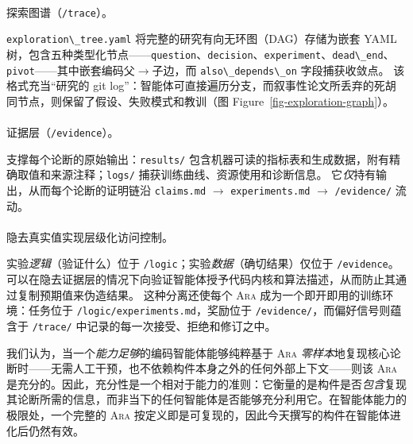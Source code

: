 \documentclass[
]{article}
\makeatletter
\let\oldparagraph\paragraph
\renewcommand{\paragraph}{
    \@ifstar
      \xxxParagraphStar
      \xxxParagraphNoStar
  }
\newcommand{\xxxParagraphStar}[1]{\oldparagraph*{#1}\mbox{}}
\newcommand{\xxxParagraphNoStar}[1]{\oldparagraph{#1}\mbox{}}
\newcommand{\passthrough}[1]{#1}
\theoremstyle{definition}
\newcommand{\ara}{\textsc{Ara}}
\makeatother
\begin{document}
\paragraph{\texorpdfstring{探索图谱（\texttt{/trace}）。}{探索图谱（/trace）。}}\label{ux63a2ux7d22ux56feux8c31trace}

\passthrough{\lstinline!exploration\_tree.yaml!}
将完整的研究有向无环图（DAG）存储为嵌套 YAML
树，包含五种类型化节点------\passthrough{\lstinline!question!}、\passthrough{\lstinline!decision!}、\passthrough{\lstinline!experiment!}、\passthrough{\lstinline!dead\_end!}、\passthrough{\lstinline!pivot!}------其中嵌套编码父\(\to\)子边，而
\passthrough{\lstinline!also\_depends\_on!} 字段捕获收敛点。
该格式充当``研究的 git
log''：智能体可直接遍历分支，而叙事性论文所丢弃的死胡同节点，则保留了假设、失败模式和教训（图
Figure~\ref{fig-exploration-graph}）。

\paragraph{\texorpdfstring{证据层（\texttt{/evidence}）。}{证据层（/evidence）。}}\label{ux8bc1ux636eux5c42evidence}

支撑每个论断的原始输出：\passthrough{\lstinline!results/!}
包含机器可读的指标表和生成数据，附有精确取值和来源注释；\passthrough{\lstinline!logs/!}
捕获训练曲线、资源使用和诊断信息。
它\emph{仅}持有输出，从而每个论断的证明链沿
\passthrough{\lstinline!claims.md!} \(\to\)
\passthrough{\lstinline!experiments.md!} \(\to\)
\passthrough{\lstinline!/evidence/!} 流动。

\paragraph{隐去真实值实现层级化访问控制。}\label{ux9690ux53bbux771fux5b9eux503cux5b9eux73b0ux5c42ux7ea7ux5316ux8bbfux95eeux63a7ux5236}

实验\emph{逻辑}（验证什么）位于
\passthrough{\lstinline!/logic!}；实验\emph{数据}（确切结果）仅位于
\passthrough{\lstinline!/evidence!}。
可以在隐去证据层的情况下向验证智能体授予代码内核和算法描述，从而防止其通过复制预期值来伪造结果。
这种分离还使每个 \ara{} 成为一个即开即用的训练环境：任务位于
\passthrough{\lstinline!/logic/experiments.md!}，奖励位于
\passthrough{\lstinline!/evidence/!}，而偏好信号则蕴含于
\passthrough{\lstinline!/trace/!} 中记录的每一次接受、拒绝和修订之中。

我们认为，当一个\emph{能力足够}的编码智能体能够纯粹基于 \ara{}
\emph{零样本}地复现核心论断时------无需人工干预，也不依赖构件本身之外的任何外部上下文------则该
\ara{}
是充分的。因此，充分性是一个相对于能力的准则：它衡量的是构件是否\emph{包含}复现其论断所需的信息，而非当下的任何智能体是否能够充分利用它。在智能体能力的极限处，一个完整的
\ara{} 按定义即是可复现的，因此今天撰写的构件在智能体进化后仍然有效。
\end{document}
